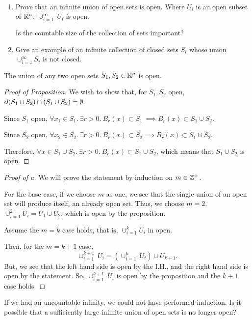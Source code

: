 \documentclass[../hw2]{subfiles}
\begin{document}
\begin{problem}[1]
\
\begin{enumerate}[label=\alph*.]
	\item Prove that an infinite union of open sets is open. Where $U_i$ is an open subset of  $\mathbb{R}^{n}$, $\cup_{i=1}^{\infty}\ U_i$ is open.

	      Is the countable size of the collection of sets important?

	\item Give an example of an infinite collection of closed sets $S_i$ whose union  $\cup_{i=1}^{\infty}S_i$ is not closed.
\end{enumerate}
\end{problem}
\begin{proposition}
	The union of any two open sets $S_1,S_2\in \mathbb{R}^{n}$ is open.
\end{proposition}
\begin{proof}[Proof of Proposition]
	We wish to show that, for $S_1,S_2$ open, $\partial{(S_1\cup S_2)}\cap (S_1\cup S_2)=\emptyset$.

	Since $S_1$ open, $\forall x_1\in S_1.\ \exists r>0.\ B_r(x)\subset S_1\ \implies B_r(x)\subset S_1\cup S_2$.

	Since $S_2$ open, $\forall x_2\in S_2.\ \exists r>0.\ B_r(x)\subset S_2 \implies B_r(x)\subset S_1\cup S_2$.

	Therefore, $\forall x\in S_1\cup S_2.\ \exists r>0.\ B_r(x)\subset S_1\cup S_2$, which means that $S_1\cup S_2$ is open.
\end{proof}
\begin{proof}[Proof of a]
	We will prove the statement by induction on $m\in \mathbb{Z}^+$.

	For the base case, if we choose $m$ as one, we see that the single union of an open set will produce itself, an already open set. Thus, we choose $m=2$, $\cup_{i=1}^{2}U_i=U_1\cup U_2$, which is open by the proposition.

	Assume the $m=k$ case holds, that is, $\cup_{i=1}^k U_i$ in open.

	Then, for the $m=k+1$ case,  \[
		\cup_{i=1}^{k+1}\ U_i=\left(\cup_{i=1}^k\ U_i\right)\cup U_{k+1}
		.\] But, we see that the left hand side is open by the I.H., and the right hand side is open by the statement. So, $\cup_{i=1}^{k+1}\ U_i$ is open by the proposition and the $k+1$ case holds.
\end{proof}
If we had an uncountable infinity, we could not have performed induction. Is it possible that a sufficiently large infinite union of open sets is no longer open?
\end{document}

